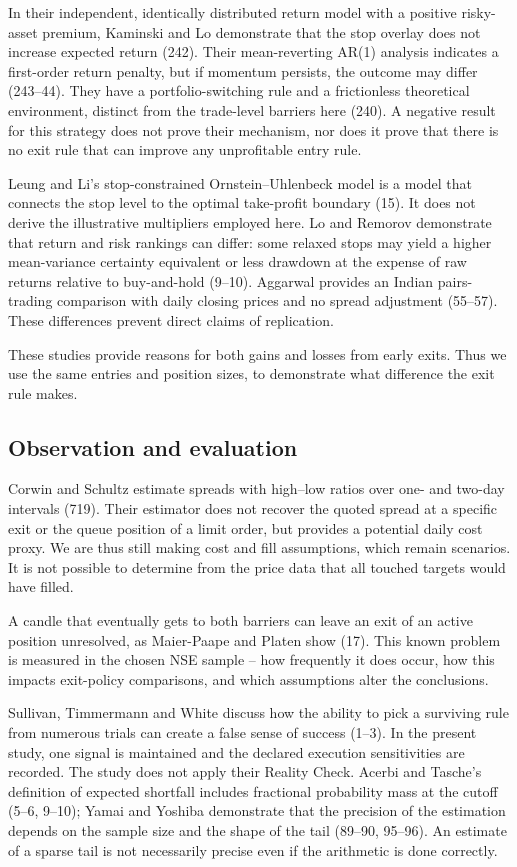 \documentclass[11pt,a4paper]{article}
\begin{document}
In their independent, identically distributed return model with a positive risky-asset premium, Kaminski and Lo demonstrate that the stop overlay does not increase expected return (242). Their mean-reverting AR(1) analysis indicates a first-order return penalty, but if momentum persists, the outcome may differ (243--44). They have a portfolio-switching rule and a frictionless theoretical environment, distinct from the trade-level barriers here (240). A negative result for this strategy does not prove their mechanism, nor does it prove that there is no exit rule that can improve any unprofitable entry rule.

Leung and Li's stop-constrained Ornstein--Uhlenbeck model is a model that connects the stop level to the optimal take-profit boundary (15). It does not derive the illustrative multipliers employed here. Lo and Remorov demonstrate that return and risk rankings can differ: some relaxed stops may yield a higher mean-variance certainty equivalent or less drawdown at the expense of raw returns relative to buy-and-hold (9--10). Aggarwal provides an Indian pairs-trading comparison with daily closing prices and no spread adjustment (55--57). These differences prevent direct claims of replication.

These studies provide reasons for both gains and losses from early exits. Thus we use the same entries and position sizes, to demonstrate what difference the exit rule makes.

\subsection*{Observation and evaluation}

Corwin and Schultz estimate spreads with high--low ratios over one- and two-day intervals (719). Their estimator does not recover the quoted spread at a specific exit or the queue position of a limit order, but provides a potential daily cost proxy. We are thus still making cost and fill assumptions, which remain scenarios. It is not possible to determine from the price data that all touched targets would have filled.

A candle that eventually gets to both barriers can leave an exit of an active position unresolved, as Maier-Paape and Platen show (17). This known problem is measured in the chosen NSE sample -- how frequently it does occur, how this impacts exit-policy comparisons, and which assumptions alter the conclusions.

Sullivan, Timmermann and White discuss how the ability to pick a surviving rule from numerous trials can create a false sense of success (1--3). In the present study, one signal is maintained and the declared execution sensitivities are recorded. The study does not apply their Reality Check. Acerbi and Tasche's definition of expected shortfall includes fractional probability mass at the cutoff (5--6, 9--10); Yamai and Yoshiba demonstrate that the precision of the estimation depends on the sample size and the shape of the tail (89--90, 95--96). An estimate of a sparse tail is not necessarily precise even if the arithmetic is done correctly.
\end{document}
